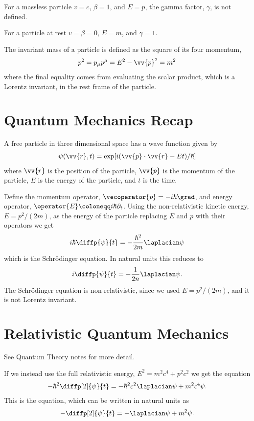\documentclass[fleqn]{NotesClass}
\begin{document}
    For a massless particle \(v = c\), \(\beta = 1\), and \(E = p\), the gamma factor, \(\gamma\), is not defined.
    
    For a particle at rest \(v = \beta = 0\), \(E = m\), and \(\gamma = 1\).
    
    The invariant mass of a particle is defined as the square of its four momentum,
    \begin{equation}
        p^2 = p_\mu p^\mu = E^2 - \vv{p}^2 = m^2
    \end{equation}
    where the final equality comes from evaluating the scalar product, which is a Lorentz invariant, in the rest frame of the particle.
    
    \section{Quantum Mechanics Recap}
    A free particle in three dimensional space has a wave function given by
    \begin{equation}
        \psi(\vv{r}, t) = \exp[i(\vv{p} \cdot \vv{r} - Et)/\hbar]
    \end{equation}
    where \(\vv{r}\) is the position of the particle, \(\vv{p}\) is the momentum of the particle, \(E\) is the energy of the particle, and \(t\) is the time.
    
    Define the momentum operator, \(\vecoperator{p} = -i\hbar\grad\), and energy operator, \(\operator{E} \coloneqq i\hbar\partial_t\).
    Using the non-relativistic kinetic energy, \(E = p^2/(2m)\), as the energy of the particle replacing \(E\) and \(p\) with their operators we get
    \begin{equation}
        i\hbar \diffp{\psi}{t} = -\frac{\hbar^2}{2m}\laplacian\psi
    \end{equation}
    which is the Schr\"odinger equation.
    In natural units this reduces to
    \begin{equation}
        i\diffp{\psi}{t} = -\frac{1}{2n}\laplacian\psi.
    \end{equation}
    The Schr\"odinger equation is non-relativistic, since we used \(E = p^2/(2m)\), and it is not Lorentz invariant.
    
    \section{Relativistic Quantum Mechanics}\label{sec:relativistic quantum mechanics}
    \begin{rmk}
        See Quantum Theory notes for more detail.
    \end{rmk}
    If we instead use the full relativistic energy, \(E^2 = m^2c^4 + p^2c^2\) we get the equation
    \begin{equation}
        -\hbar^2\diffp[2]{\psi}{t} = -\hbar^2c^2\laplacian\psi + m^2c^4\psi.
    \end{equation}
    This is the  equation, which can be written in natural units as
    \begin{equation}
        -\diffp[2]{\psi}{t} = -\laplacian\psi + m^2\psi.
    \end{equation}
    
\end{document}
